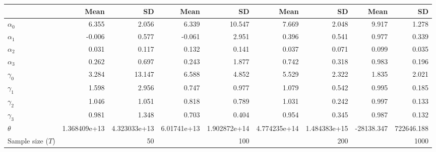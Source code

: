 
\begin{tabular}[t]{lrrrrrrrr}
\toprule
  & Mean & SD & Mean  & SD  & Mean   & SD   & Mean    & SD   \\
\midrule
$\alpha_{0}$ & 6.355 & 2.056 & 6.339 & 10.547 & 7.669 & 2.048 & 9.917 & 1.278\\
$\alpha_{1}$ & -0.006 & 0.577 & -0.061 & 2.951 & 0.396 & 0.541 & 0.977 & 0.339\\
$\alpha_{2}$ & 0.031 & 0.117 & 0.132 & 0.141 & 0.037 & 0.071 & 0.099 & 0.035\\
$\alpha_{3}$ & 0.262 & 0.697 & 0.243 & 1.877 & 0.742 & 0.318 & 0.983 & 0.196\\
$\gamma_{0}$ & 3.284 & 13.147 & 6.588 & 4.852 & 5.529 & 2.322 & 1.835 & 2.021\\
$\gamma_{1}$ & 1.598 & 2.956 & 0.747 & 0.977 & 1.079 & 0.542 & 0.995 & 0.185\\
$\gamma_{2}$ & 1.046 & 1.051 & 0.818 & 0.789 & 1.031 & 0.242 & 0.997 & 0.133\\
$\gamma_{3}$ & 0.981 & 1.348 & 0.703 & 0.404 & 0.954 & 0.345 & 0.987 & 0.132\\
$\theta$ & 1.368409e+13 & 4.323033e+13 & 6.01741e+13 & 1.902872e+14 & 4.774235e+14 & 1.484383e+15 & -28138.347 & 722646.188\\
Sample size ($T$) &  & 50 &  & 100 &  & 200 &  & 1000\\
\bottomrule
\end{tabular}
